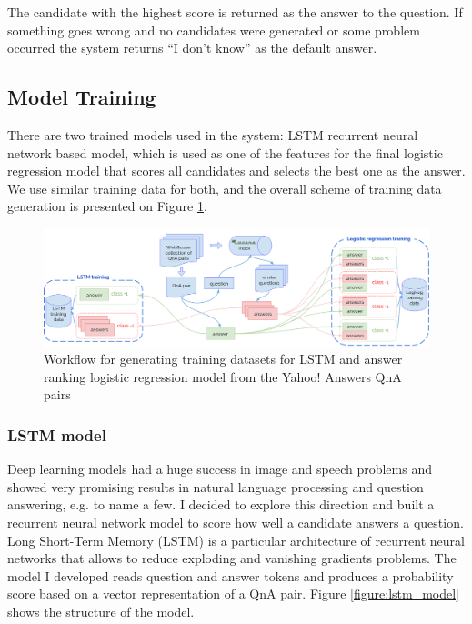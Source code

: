 \documentclass[]{article}
\begin{document}
The candidate with the highest score is returned as the answer to the question.
If something goes wrong and no candidates were generated or some problem occurred the system returns ``I don't know'' as the default answer.

\subsection{Model Training}

There are two trained models used in the system: LSTM recurrent neural network based model, which is used as one of the features for the final logistic regression model that scores all candidates and selects the best one as the answer.
We use similar training data for both, and the overall scheme of training data generation is presented on Figure \ref{figure:model_training}.

\begin{figure}
	\includegraphics[width=470px]{img/model_training}
	\caption{Workflow for generating training datasets for LSTM and answer ranking logistic regression model from the Yahoo! Answers QnA pairs}
	\label{figure:model_training}
\end{figure}

\subsubsection{LSTM model}
\label{section:lstm}

Deep learning models had a huge success in image and speech problems and showed very promising results in natural language processing and question answering, e.g. \cite{yu2014deep,diwang_lstm_2015} to name a few.
I decided to explore this direction and built a recurrent neural network model to score how well a candidate answers a question.
Long Short-Term Memory (LSTM) \cite{hochreiter1997long} is a particular architecture of recurrent neural networks that allows to reduce exploding and vanishing gradients problems.
The model I developed reads question and answer tokens and produces a probability score based on a vector representation of a QnA pair.
Figure \ref{figure:lstm_model} shows the structure of the model.
\end{document}
